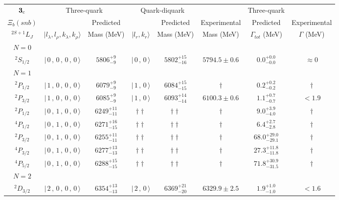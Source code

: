 \begin{tabular}{c| c c c c c c c}\hline \hline
${\bf {3}}_{\rm c}$ & \multicolumn{2}{c}{Three-quark} &  \multicolumn{2}{c}{Quark-diquark}   &    &  Three-quark  &\\ 
$\Xi_{b}(snb)$ &   & Predicted  &   &  Predicted   &  Experimental &  Predicted            & Experimental \\ 
 $^{2S+1}L_{J}$ & $\vert l_{\lambda}, l_{\rho}, k_{\lambda}, k_{\rho} \rangle$ & Mass (MeV)  & $\vert l_{r}, k_{r} \rangle$  &  Mass (MeV)   &  Mass (MeV)   &  $\Gamma_{tot}$ (MeV) & $\Gamma$ (MeV) \\ \hline
\hline
 $N=0$  &  &  &  &  &  \\ 
$^{2}S_{1/2}$ & $\vert \,0\,,\,0\,,\,0\,,\,0 \,\rangle $ & $5806^{+9}_{-9}$ & $\vert \,0\,,\,0 \,\rangle$ & $5802^{+15}_{-16}$ & $5794.5\pm 0.6$ & $0.0^{+0.0}_{-0.0}$ & $\approx 0$ \\ 
\hline
 $N=1$  &  &  &  &  &  \\ 
$^{2}P_{1/2}$ & $\vert \,1\,,\,0\,,\,0\,,\,0 \,\rangle $ & $6079^{+9}_{-9}$ & $\vert \,1\,,\,0 \,\rangle$ & $6084^{+15}_{-15}$ & $\dagger$ & $0.2^{+0.2}_{-0.2}$ & $\dagger$ \\ 
$^{2}P_{3/2}$ & $\vert \,1\,,\,0\,,\,0\,,\,0 \,\rangle $ & $6085^{+9}_{-9}$ & $\vert \,1\,,\,0 \,\rangle$ & $6093^{+14}_{-14}$ & $6100.3\pm 0.6$ & $1.1^{+0.7}_{-0.7}$ & $<1.9$ \\ 
$^{2}P_{1/2}$ & $\vert \,0\,,\,1\,,\,0\,,\,0 \,\rangle $ & $6249^{+11}_{-11}$ & $\dagger\dagger$ & $\dagger\dagger$ & $\dagger$ & $9.0^{+3.9}_{-4.0}$ & $\dagger$ \\ 
$^{4}P_{1/2}$ & $\vert \,0\,,\,1\,,\,0\,,\,0 \,\rangle $ & $6271^{+16}_{-15}$ & $\dagger\dagger$ & $\dagger\dagger$ & $\dagger$ & $6.4^{+2.7}_{-2.8}$ & $\dagger$ \\ 
$^{2}P_{3/2}$ & $\vert \,0\,,\,1\,,\,0\,,\,0 \,\rangle $ & $6255^{+11}_{-11}$ & $\dagger\dagger$ & $\dagger\dagger$ & $\dagger$ & $68.0^{+29.0}_{-29.1}$ & $\dagger$ \\ 
$^{4}P_{3/2}$ & $\vert \,0\,,\,1\,,\,0\,,\,0 \,\rangle $ & $6277^{+13}_{-13}$ & $\dagger\dagger$ & $\dagger\dagger$ & $\dagger$ & $27.3^{+11.8}_{-11.8}$ & $\dagger$ \\ 
$^{4}P_{5/2}$ & $\vert \,0\,,\,1\,,\,0\,,\,0 \,\rangle $ & $6288^{+15}_{-15}$ & $\dagger\dagger$ & $\dagger\dagger$ & $\dagger$ & $71.8^{+30.9}_{-31.5}$ & $\dagger$ \\ 
\hline
 $N=2$  &  &  &  &  &  \\ 
$^{2}D_{3/2}$ & $\vert \,2\,,\,0\,,\,0\,,\,0 \,\rangle $ & $6354^{+13}_{-13}$ & $\vert \,2\,,\,0 \,\rangle$ & $6369^{+21}_{-20}$ & $6329.9\pm 2.5$ & $1.9^{+1.0}_{-1.0}$ & $<1.6$ \\ 

\end{tabular}
